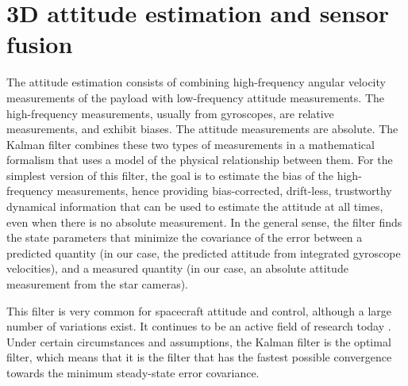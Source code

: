 \section{3D attitude estimation and sensor fusion}
\label{sec:KalmanFilter}
\renewcommand*{\arraystretch}{0.75}


The attitude estimation consists of combining high-frequency angular velocity measurements of the payload with low-frequency attitude measurements. The high-frequency measurements, usually from gyroscopes, are relative measurements, and exhibit biases. The attitude measurements are absolute. The Kalman filter \citep{Kalman:1960ii} combines these two types of measurements in a mathematical formalism that uses a model of the physical relationship between them. For the simplest version of this filter, the goal is to estimate the bias of the high-frequency measurements, hence providing bias-corrected, drift-less, trustworthy dynamical information that can be used to estimate the attitude at all times, even when there is no absolute measurement. In the general sense, the filter finds the state parameters that minimize the covariance of the error between a predicted quantity (in our case, the predicted attitude from integrated gyroscope velocities), and a measured quantity (in our case, an absolute attitude measurement from the star cameras). 


This filter is very common for spacecraft attitude and control, although a large number of variations exist. %
It continues to be an active field of research today \citep[e.g.,][]{Crassidis:2011ud,Markley:2014dn}. Under certain circumstances and assumptions, the Kalman filter is the optimal filter, which means that it is the filter that has the fastest possible convergence towards the minimum steady-state error covariance.


